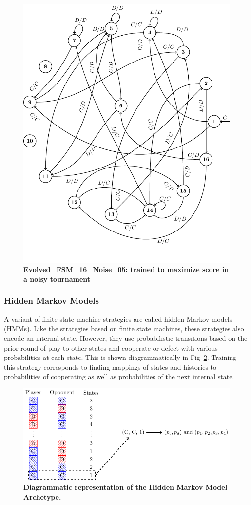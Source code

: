 \documentclass[10pt,letterpaper]{article}
\begin{document}
\begin{figure}
        \centering
        \includegraphics[width=.5\textwidth]{FSM16noise.pdf}
        \caption{\bf Evolved\_FSM\_16\_Noise\_05: trained to maximize score in a
        noisy tournament}
        \label{fig:fsm16noise}
\end{figure}


\subsubsection*{Hidden Markov Models}\label{sec:hmm}

A variant of finite state machine strategies are called hidden Markov models
(HMMs). Like the strategies based on finite state machines, these strategies
also encode an internal state. However, they use probabilistic transitions based on the
prior round of play to other states and cooperate or defect with various
probabilities at each state. This is
shown diagrammatically in Fig~\ref{fig:hmm}. Training this strategy
corresponds to finding mappings of states and histories to probabilities of
cooperating as well as probabilities of the next internal state.

\begin{figure}[!hbtp]
    \centering
    \includegraphics[width=\textwidth]{hmm.pdf}
    \caption{\bf Diagrammatic representation of the Hidden Markov Model Archetype.}
    \label{fig:hmm}
\end{figure}
\end{document}
